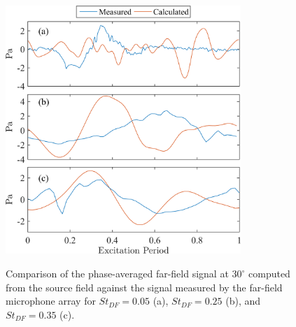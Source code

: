 \begin{figure}
	\centering
		\includegraphics[width=3.5in]{Figures/Farfield_Validation.png}\\
	\caption{Comparison of the phase-averaged far-field signal at $30^\circ$ computed from the source field against the signal measured by the far-field microphone array for $St_{DF} = 0.05$ (a), $St_{DF} = 0.25$ (b), and $St_{DF} = 0.35$ (c).}
	\label{fig:ch5_farfield}
\end{figure}

